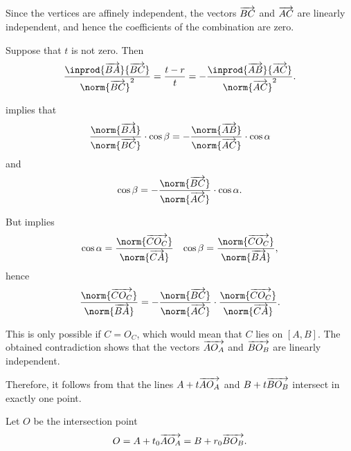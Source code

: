 \begin{defproof}
  Since the vertices are affinely independent, the vectors \( \overrightarrow{BC} \) and \( \overrightarrow{AC} \) are linearly independent, and hence the coefficients of the combination are zero.

  Suppose that \( t \) is not zero. Then
  \begin{equation*}
    \frac {\inprod {\vect{BA}} {\vect{BC}}} {\norm{\vect{BC}}^2} = \frac {t - r} t = - \frac {\inprod {\vect{AB}} {\vect{AC}}} {\norm{\vect{AC}}^2}.
  \end{equation*}

   implies that
  \begin{equation*}
    \frac {\norm{\vect{BA}}} {\norm{\vect{BC}}} \cdot \cos \beta
    =
    -\frac {\norm{\vect{AB}}} {\norm{\vect{AC}}} \cdot \cos \alpha
  \end{equation*}
  and
  \begin{equation*}
    \cos \beta = -\frac {\norm{\vect{BC}}} {\norm{\vect{AC}}} \cdot \cos \alpha.
  \end{equation*}

  But  implies
  \begin{align*}
    \cos \alpha = \frac {\norm{\vect{C O_C}}} {\norm{\vect{C A}}}
    &&
    \cos \beta = \frac {\norm{\vect{C O_C}}} {\norm{\vect{B A}}},
  \end{align*}
  hence
  \begin{equation*}
    \frac {\norm{\vect{C O_C}}} {\norm{\vect{B A}}}
    =
    -\frac {\norm{\vect{BC}}} {\norm{\vect{AC}}} \cdot \frac {\norm{\vect{C O_C}}} {\norm{\vect{C A}}}.
  \end{equation*}

  This is only possible if \( C = O_C \), which would mean that \( C \) lies on \( [A, B] \). The obtained contradiction shows that the vectors \( \overrightarrow{A O_A} \) and \( \overrightarrow{B O_B} \) are linearly independent.

  Therefore, it follows from  that the lines \( A + t \overrightarrow{A O_A} \) and \( B + t \overrightarrow{B O_B} \) intersect in exactly one point.

  Let \( O \) be the intersection point
  \begin{equation*}
    O = A + t_0 \overrightarrow{A O_A} = B + r_0 \overrightarrow{B O_B}.
  \end{equation*}


\end{defproof}

